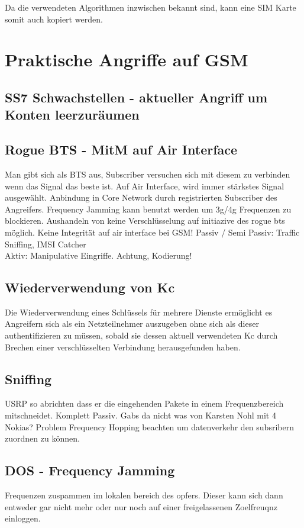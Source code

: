 Da die verwendeten Algorithmen inzwischen bekannt sind, kann eine SIM Karte somit auch kopiert werden. 

\section{Praktische Angriffe auf GSM} \label{hdl:grundlagen_praktische-angriffe-gsm}
\subsection{SS7 Schwachstellen - aktueller Angriff um Konten leerzuräumen}

\subsection{Rogue BTS - MitM auf Air Interface}
Man gibt sich als BTS aus, Subscriber versuchen sich mit diesem zu verbinden wenn das Signal das beste ist. Auf Air Interface, wird immer stärkstes Signal ausgewählt. Anbindung in Core Network durch registrierten Subscriber des Angreifers. Frequency Jamming kann benutzt werden um 3g/4g Frequenzen zu blockieren.
Aushandeln von keine Verschlüsselung auf initiazive des rogue bts möglich.
Keine Integrität auf air interface bei GSM!
Passiv / Semi Passiv: Traffic Sniffing, IMSI Catcher\\
Aktiv: Manipulative Eingriffe. Achtung, Kodierung! 


\subsection{Wiederverwendung von Kc}
Die Wiederverwendung eines Schlüssels für mehrere Dienste ermöglicht es Angreifern sich als ein Netzteilnehmer auszugeben ohne sich als dieser authentifizieren zu müssen, sobald sie dessen aktuell verwendeten \ac{Kc} durch Brechen einer verschlüsselten Verbindung herausgefunden haben.

\subsection{Sniffing}
USRP so abrichten dass er die eingehenden Pakete in einem Frequenzbereich mitschneidet. Komplett Passiv.
Gabs da nicht was von Karsten Nohl mit 4 Nokias?
Problem Frequency Hopping beachten um datenverkehr den subsribern zuordnen zu können.

\subsection{DOS - Frequency Jamming}
Frequenzen zuspammen im lokalen bereich des opfers. Dieser kann sich dann entweder gar nicht mehr oder nur noch auf einer freigelassenen Zoelfreuqnz einloggen.

